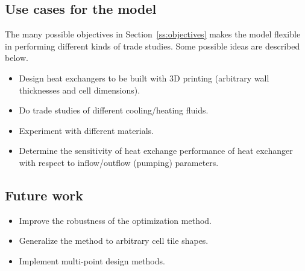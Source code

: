 \documentclass{article}
\begin{document}
\subsection{Use cases for the model}

The many possible objectives in Section~\ref{ss:objectives} makes the model flexible in performing different kinds of trade studies. Some possible ideas are described below. 

\begin{itemize}
	\item Design heat exchangers to be built with 3D printing (arbitrary wall thicknesses and cell dimensions).
	\item Do trade studies of different cooling/heating fluids.
    \item Experiment with different materials. 
    \item Determine the sensitivity of heat exchange performance of heat exchanger with respect to inflow/outflow (pumping) parameters. 
\end{itemize}

\subsection{Future work}

\begin{itemize}
\item Improve the robustness of the optimization method.
\item Generalize the method to arbitrary cell tile shapes.
\item Implement multi-point design methods. 
\end{itemize}
\end{document}
